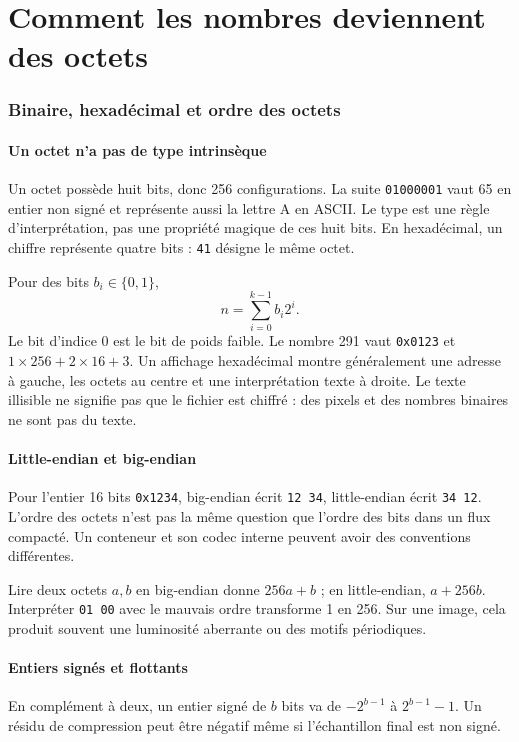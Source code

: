 \part{Comment les nombres deviennent des octets}
\section{Binaire, hexadécimal et ordre des octets}
\subsection{Un octet n'a pas de type intrinsèque}
Un octet possède huit bits, donc 256 configurations. La suite
\texttt{01000001} vaut 65 en entier non signé et représente aussi
la lettre A en ASCII. Le type est une règle d'interprétation, pas
une propriété magique de ces huit bits. En hexadécimal, un chiffre
représente quatre bits : \texttt{41} désigne le même octet.

Pour des bits $b_i\in\{0,1\}$,
\begin{equation}
n=\sum_{i=0}^{k-1}b_i2^i.
\end{equation}
Le bit d'indice 0 est le bit de poids faible. Le nombre 291 vaut
\texttt{0x0123} et $1\times256+2\times16+3$.
Un affichage hexadécimal montre généralement une adresse à gauche,
les octets au centre et une interprétation texte à droite. Le texte
illisible ne signifie pas que le fichier est chiffré : des pixels
et des nombres binaires ne sont pas du texte.

\subsection{Little-endian et big-endian}
Pour l'entier 16 bits \texttt{0x1234}, big-endian écrit
\texttt{12 34}, little-endian écrit \texttt{34 12}.
L'ordre des octets n'est pas la même question que l'ordre des bits
dans un flux compacté. Un conteneur et son codec interne peuvent
avoir des conventions différentes.

Lire deux octets $a,b$ en big-endian donne $256a+b$ ; en
little-endian, $a+256b$. Interpréter \texttt{01 00} avec le mauvais
ordre transforme 1 en 256. Sur une image, cela produit souvent
une luminosité aberrante ou des motifs périodiques.

\subsection{Entiers signés et flottants}
En complément à deux, un entier signé de $b$ bits va de
$-2^{b-1}$ à $2^{b-1}-1$. Un résidu de compression peut être
négatif même si l'échantillon final est non signé.

